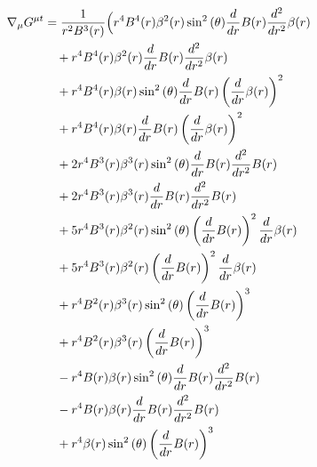 \documentclass[11pt,a4paper]{article}
\begin{document}
\begin{align*}
  \nabla_\mu G^{\mu t} &= \frac{1}{r^{2} B^{3}{\left(r \right)}}\Bigl(r^{4} B^{4}{\left(r \right)} \beta^{2}{\left(r \right)} \sin^{2}{\left(\theta \right)} \frac{d}{d r} B{\left(r \right)} \frac{d^{2}}{d r^{2}} \beta{\left(r \right)} \\
  &\quad + r^{4} B^{4}{\left(r \right)} \beta^{2}{\left(r \right)} \frac{d}{d r} B{\left(r \right)} \frac{d^{2}}{d r^{2}} \beta{\left(r \right)} \\
  &\quad + r^{4} B^{4}{\left(r \right)} \beta{\left(r \right)} \sin^{2}{\left(\theta \right)} \frac{d}{d r} B{\left(r \right)} \left(\frac{d}{d r} \beta{\left(r \right)}\right)^{2} \\
  &\quad + r^{4} B^{4}{\left(r \right)} \beta{\left(r \right)} \frac{d}{d r} B{\left(r \right)} \left(\frac{d}{d r} \beta{\left(r \right)}\right)^{2} \\
  &\quad + 2 r^{4} B^{3}{\left(r \right)} \beta^{3}{\left(r \right)} \sin^{2}{\left(\theta \right)} \frac{d}{d r} B{\left(r \right)} \frac{d^{2}}{d r^{2}} B{\left(r \right)} \\
  &\quad + 2 r^{4} B^{3}{\left(r \right)} \beta^{3}{\left(r \right)} \frac{d}{d r} B{\left(r \right)} \frac{d^{2}}{d r^{2}} B{\left(r \right)} \\
  &\quad + 5 r^{4} B^{3}{\left(r \right)} \beta^{2}{\left(r \right)} \sin^{2}{\left(\theta \right)} \left(\frac{d}{d r} B{\left(r \right)}\right)^{2} \frac{d}{d r} \beta{\left(r \right)} \\
  &\quad + 5 r^{4} B^{3}{\left(r \right)} \beta^{2}{\left(r \right)} \left(\frac{d}{d r} B{\left(r \right)}\right)^{2} \frac{d}{d r} \beta{\left(r \right)} \\
  &\quad + r^{4} B^{2}{\left(r \right)} \beta^{3}{\left(r \right)} \sin^{2}{\left(\theta \right)} \left(\frac{d}{d r} B{\left(r \right)}\right)^{3} \\
  &\quad + r^{4} B^{2}{\left(r \right)} \beta^{3}{\left(r \right)} \left(\frac{d}{d r} B{\left(r \right)}\right)^{3} \\
  &\quad - r^{4} B{\left(r \right)} \beta{\left(r \right)} \sin^{2}{\left(\theta \right)} \frac{d}{d r} B{\left(r \right)} \frac{d^{2}}{d r^{2}} B{\left(r \right)} \\
  &\quad - r^{4} B{\left(r \right)} \beta{\left(r \right)} \frac{d}{d r} B{\left(r \right)} \frac{d^{2}}{d r^{2}} B{\left(r \right)} \\
  &\quad + r^{4} \beta{\left(r \right)} \sin^{2}{\left(\theta \right)} \left(\frac{d}{d r} B{\left(r \right)}\right)^{3} \\

\end{align*}
\end{document}
